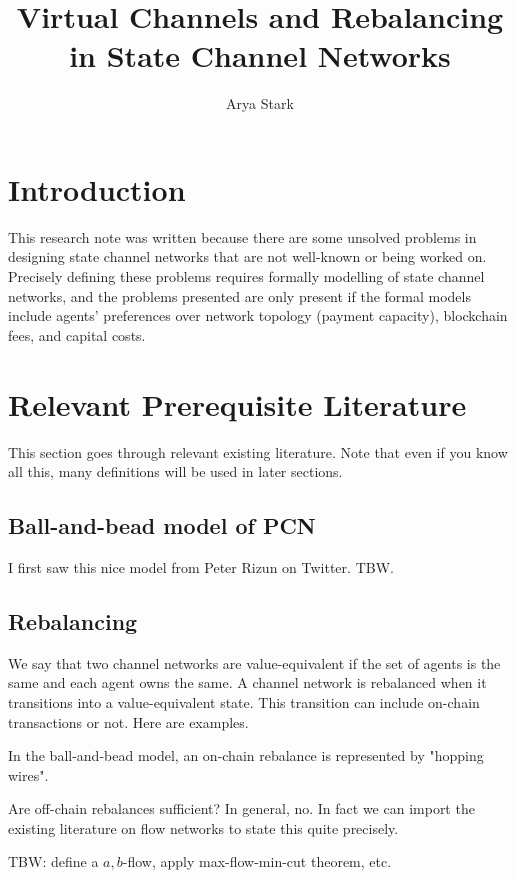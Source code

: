 \documentclass{article}
\author{Arya Stark}
\title{Virtual Channels and Rebalancing in State Channel Networks}
\date{}
\begin{document}
\maketitle

\section*{Introduction}

This research note was written because there are some unsolved problems in designing state channel networks that are not well-known or being worked on. Precisely defining these problems requires formally modelling of state channel networks, and the problems presented are only present if the formal models include agents' preferences over network topology (payment capacity), blockchain fees, and capital costs.

\section*{Relevant Prerequisite Literature}

This section goes through relevant existing literature. Note that even if you know all this, many definitions will be used in later sections.

\subsection*{Ball-and-bead model of PCN}

I first saw this nice model from Peter Rizun on Twitter. TBW.

\subsection*{Rebalancing}

We say that two channel networks are value-equivalent if the set of agents is the same and each agent owns the same. A channel network is rebalanced when it transitions into a value-equivalent state. This transition can include on-chain transactions or not. Here are examples.

In the ball-and-bead model, an on-chain rebalance is represented by "hopping wires".

Are off-chain rebalances sufficient? In general, no. In fact we can import the existing literature on flow networks to state this quite precisely.

TBW: define a $a,b$-flow, apply max-flow-min-cut theorem, etc.
\end{document}

